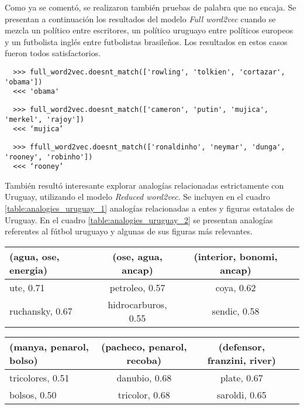 Como ya se comentó, se realizaron también pruebas de palabra que no encaja. Se presentan
a continuación los resultados del modelo \textit{Full word2vec} cuando se mezcla un político
entre escritores, un político uruguayo entre políticos europeos y un futbolista inglés entre
futbolistas brasileños. Los resultados en estos casos fueron todos satisfactorios.

\begin{lstlisting}
  >>> full_word2vec.doesnt_match(['rowling', 'tolkien', 'cortazar', 'obama'])
  <<< 'obama'
\end{lstlisting}

\begin{lstlisting}
  >>> full_word2vec.doesnt_match(['cameron', 'putin', 'mujica', 'merkel', 'rajoy'])
  <<< ‘mujica’
\end{lstlisting}

\begin{lstlisting}
  >>> ffull_word2vec.doesnt_match(['ronaldinho', 'neymar', 'dunga', 'rooney', 'robinho'])
  <<< ‘rooney’
\end{lstlisting}

También resultó interesante explorar analogías relacionadas estrictamente con Uruguay,
utilizando el modelo \textit{Reduced word2vec}. Se incluyen en el cuadro
\ref{table:analogies_uruguay_1} analogías relacionadas a entes y figuras estatales de
Uruguay. En el cuadro \ref{table:analogies_uruguay_2} se presentan analogías referentes
al fútbol uruguayo y algunas de sus figuras más relevantes.

\begin{table*}[ht]
    \centering
    \begin{tabular}{lccc}
        \hline
        (agua, ose, energia) & (ose, agua, ancap) & (interior, bonomi, ancap)\\
        \hline
        ute, 0.71 & petroleo, 0.57 & coya, 0.62\\
        ruchansky, 0.67 & hidrocarburos, 0.55 & sendic, 0.58\\
        \hline
    \end{tabular}
    \caption{Analogías relacionadas a entes públicos uruguayos.}
    \label{table:analogies_uruguay_1}
\end{table*}

\begin{table*}[ht]
    \centering
    \begin{tabular}{lccc}
        \hline
        (manya, penarol, bolso) & (pacheco, penarol, recoba) & (defensor, franzini, river)\\
        \hline
        tricolores, 0.51 & danubio, 0.68 & plate, 0.67\\
        bolsos, 0.50 & tricolor, 0.68 & saroldi, 0.65\\
        \hline
    \end{tabular}
    \caption{Analogías relacionadas al fútbol uruguayo.}
    \label{table:analogies_uruguay_2}
\end{table*}

